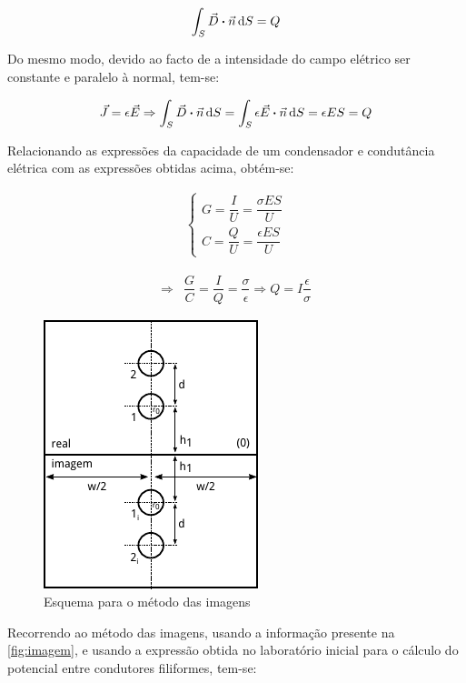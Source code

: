 \documentclass[11pt, a4paper, titlepage, portuguese]{article}
\begin{document}
	\begin{align*}
			\int_S \vec{D} \vdot \vec{n} \dd{S} = Q
	\end{align*}

	\par
	Do mesmo modo, devido ao facto de a intensidade do campo elétrico ser constante e paralelo à normal, tem-se:

	\begin{align*}
		\vec{J} = \epsilon \vec{E} \Rightarrow \int_S \vec{D} \vdot \vec{n} \dd{S} = \int_S \epsilon \vec{E} \vdot \vec{n} \dd{S} = \epsilon E S = Q
	\end{align*}

	\par
	Relacionando as expressões da capacidade de um condensador e condutância elétrica com as expressões obtidas acima, obtém-se:

	\begin{align*}
		\begin{cases}
			G = \dfrac{I}{U} = \dfrac{\sigma E S}{U} \\[1em]
    	C = \dfrac{Q}{U} = \dfrac{\epsilon E S}{U}
 		\end{cases}
	\end{align*}

	\begin{align*}
		\Rightarrow &\dfrac{G}{C} = \dfrac{I}{Q} = \dfrac{\sigma}{\epsilon} \Rightarrow Q = I\dfrac{\epsilon}{\sigma}
	\end{align*}

	\begin{figure}[H]
		\centering
		\includegraphics[width=0.4\linewidth]{imagem.pdf}
		\caption{Esquema para o método das imagens}
		\label{fig:imagem}
	\end{figure}

	Recorrendo ao método das imagens, usando a informação presente na \autoref{fig:imagem}, e usando a expressão obtida no laboratório inicial para o cálculo do potencial entre condutores filiformes, tem-se:
\end{document}
